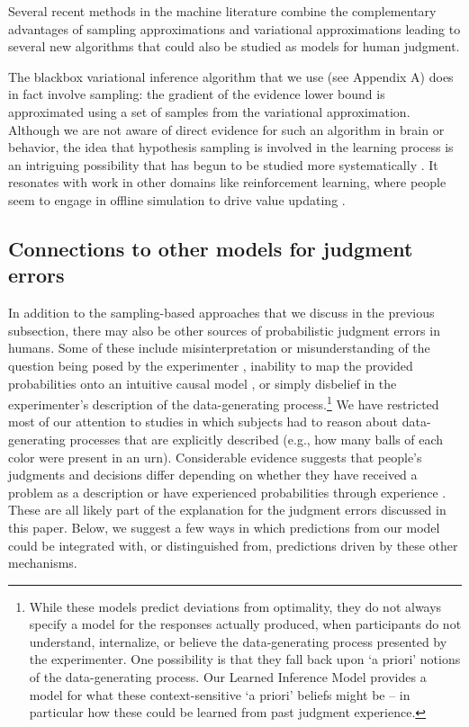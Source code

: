 Several recent methods in the machine literature combine the complementary advantages of sampling approximations and variational approximations leading to several new algorithms \citep{li2017approximate, naesseth2017variational, ruiz2019contrast} that could also be studied as models for human judgment.

The blackbox variational inference algorithm that we use (see Appendix A) does in fact involve sampling: the gradient of the evidence lower bound is approximated using a set of samples from the variational approximation. Although we are not aware of direct evidence for such an algorithm in brain or behavior, the idea that hypothesis sampling is involved in the learning process is an intriguing possibility that has begun to be studied more systematically \citep{bramley2017formalizing,bramley2018grounding,rule2018learning}. It resonates with work in other domains like reinforcement learning, where people seem to engage in offline simulation to drive value updating \citep{gershman2014retrospective,gershman2017imaginative,momennejad2018offline}.

\subsection{Connections to other models for judgment errors}

In addition to the sampling-based approaches that we discuss in the previous subsection, there may also be other sources of probabilistic judgment errors in humans. Some of these include misinterpretation or misunderstanding of the question being posed by the experimenter \citep{villejoubert2002inverse}, inability to map the provided probabilities onto an intuitive causal model \citep{krynski2007role}, or simply disbelief in the experimenter's description of the data-generating process.\footnote{While these models predict deviations from optimality, they do not always specify a model for the responses actually produced, when participants do not understand, internalize, or believe the data-generating process presented by the experimenter. One possibility is that they fall back upon `a priori' notions of the data-generating process. Our Learned Inference Model provides a model for what these context-sensitive `a priori' beliefs might be -- in particular how these could be learned from past judgment experience.} We have restricted most of our attention to studies in which subjects had to reason about data-generating processes that are explicitly described (e.g., how many balls of each color were present in an urn). Considerable evidence suggests that people's judgments and decisions differ depending on whether they have received a problem as a description or have experienced probabilities through experience \citep{hertwig2009description,hertwig2018experience}. These are all likely part of the explanation for the judgment errors discussed in this paper. Below, we suggest a few ways in which predictions from our model could be integrated with, or distinguished from, predictions driven by these other mechanisms. 
 
